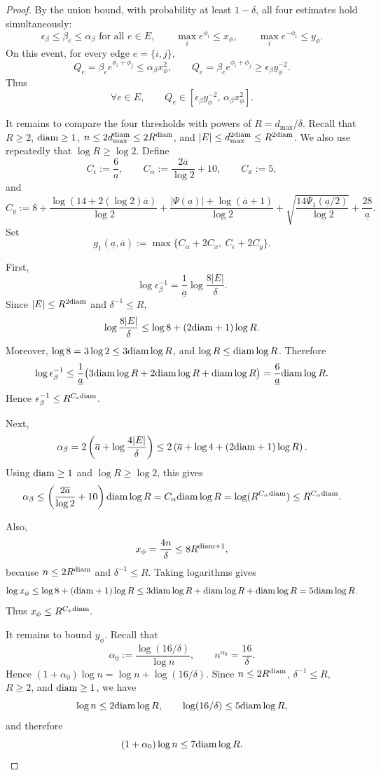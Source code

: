 \documentclass[a4paper, 11pt]{article}
\newcommand{\diam}{\textnormal{diam}}
\begin{document}
\begin{proof}
By the union bound, with probability at least $1-\delta$, all four estimates hold simultaneously:
\[
\epsilon_\beta\le\beta_e\le\alpha_\beta\text{ for all }e\in E,
\qquad
\max_i e^{\phi_i}\le x_\phi,
\qquad
\max_i e^{-\phi_i}\le y_\phi.
\]
On this event, for every edge $e=\{i,j\}$,
\[
Q_e=\beta_e e^{\phi_i+\phi_j}
\le
\alpha_\beta x_\phi^2,
\qquad
Q_e=\beta_e e^{\phi_i+\phi_j}
\ge
\epsilon_\beta y_\phi^{-2}.
\]
Thus
\begin{equation}
\label{eqn:Q-real-thresholds}
\forall e\in E,\qquad
Q_e\in[\epsilon_\beta y_\phi^{-2},\,\alpha_\beta x_\phi^2].
\end{equation}


It remains to compare the four thresholds with powers of \(R=d_{\max}/\delta\).
Recall that \(R\ge2\), \(\diam\ge1\), \(n\le2d_{\max}^{\diam}\le2R^\diam\), and
\(|E|\le d_{\max}^{2\diam}\le R^{2\diam}\). We also use repeatedly that
\(\log R\ge\log2\). Define
\[
C_\epsilon:=\frac{6}{\underline a},
\qquad
C_\alpha:=\frac{2\overline a}{\log2}+10,
\qquad
C_x:=5,
\]
and
\[
C_y
:=
8
+
\frac{\log(14+2(\log2)\overline a)}{\log2}
+
\frac{|\Psi(\underline a)|+\log(\overline a+1)}{\log2}
+
\sqrt{\frac{14\Psi_1(\underline a/2)}{\log2}}
+
\frac{28}{\underline a}.
\]
Set
\[
g_1(\underline a,\overline a)
:=
\max\{C_\alpha+2C_x,\ C_\epsilon+2C_y\}.
\]

First,
\[
\log\epsilon_\beta^{-1}
=
\frac{1}{\underline a}\log\frac{8|E|}{\delta}.
\]
Since \(|E|\le R^{2\diam}\) and \(\delta^{-1}\le R\),
\[
\log\frac{8|E|}{\delta}
\le
\log 8+(2\diam+1)\log R.
\]
Moreover, \(\log 8=3\log2\le3\diam\log R\), and
\(\log R\le\diam\log R\). Therefore
\[
\log\epsilon_\beta^{-1}
\le
\frac{1}{\underline a}\bigl(3\diam\log R+2\diam\log R+\diam\log R\bigr)
=
\frac{6}{\underline a}\diam\log R.
\]
Hence $\epsilon_\beta^{-1}\le R^{C_\epsilon\diam}$.

Next,
\[
\alpha_\beta
=
2\left(\overline a+\log\frac{4|E|}{\delta}\right)
\le
2\left(\overline a+\log4+(2\diam+1)\log R\right).
\]
Using \(\diam\ge1\) and \(\log R\ge\log2\), this gives
\[
\alpha_\beta
\le
\left(\frac{2\overline a}{\log2}+10\right)\diam\log R = C_\alpha\diam\log R = \log (R^{C_\alpha\diam}) \le R^{C_\alpha\diam}.
\]

Also,
\[
x_\phi=\frac{4n}{\delta}
\le
8R^{\diam+1},
\]
because \(n\le2R^\diam\) and \(\delta^{-1}\le R\). Taking logarithms gives
\[
\log x_\phi
\le
\log8+(\diam+1)\log R
\le
3\diam\log R+\diam\log R+\diam\log R
=
5\diam\log R.
\]
Thus
\(
x_\phi\le R^{C_x\diam}.
\)

It remains to bound \(y_\phi\). Recall that
\[
\alpha_0:=\frac{\log(16/\delta)}{\log n},
\qquad
n^{\alpha_0}=\frac{16}{\delta}.
\]
Hence \((1+\alpha_0)\log n=\log n+\log(16/\delta)\). Since \(n\le2R^\diam\),
\(\delta^{-1}\le R\), \(R\ge2\), and \(\diam\ge1\), we have
\[
\log n\le2\diam\log R,
\qquad
\log(16/\delta)\le5\diam\log R,
\]
and therefore
\[
(1+\alpha_0)\log n\le7\diam\log R.
\]


\end{proof}
\end{document}
